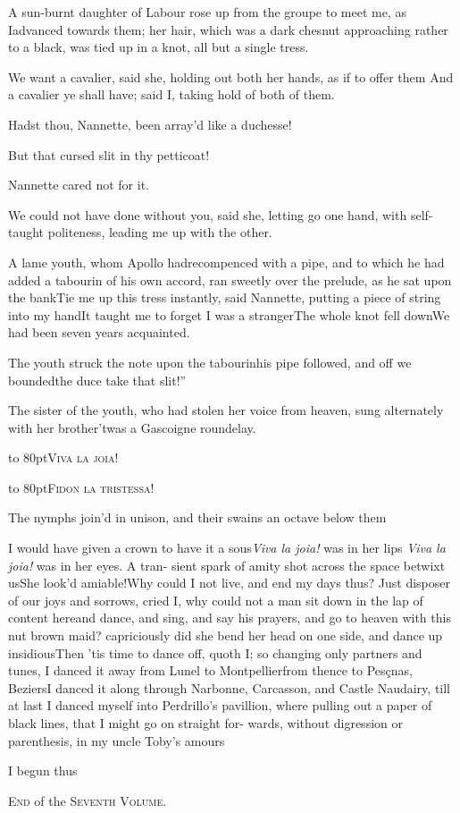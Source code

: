 \documentclass{article}
\begin{document}
A sun-burnt daughter of Labour rose up from the groupe to meet
me, as I\break advanced towards them; her hair, which was a dark chesnut
approaching rather to a black, was tied up in a knot, all but a
single tress.

We want a cavalier, said she, holding out both her hands, as if
to offer them\tsk{}
And a cavalier ye shall have; said I, taking
hold of both of them.

Hadst thou, Nannette, been array’d like a
duchesse!

\tsh But that cursed slit in thy petticoat!

Nannette cared not for it.

We could not have done without you, said she, letting go one
hand, with self-taught politeness, leading me up with the
other.

A lame youth, whom Apollo had\break recompenced with a pipe, and
to which he had added a tabourin of his own accord, ran sweetly
over the prelude, as he sat upon the bank\tsh Tie me up this
tress instantly, said Nannette, putting a piece of string into
my hand\tsk It taught me to forget I was a stranger\tsh The
whole knot fell down\tsh We had been seven years acquainted.

The youth struck the note upon the tabourin\tsk his pipe
followed, and off we bounded\tsh \lqq the duce
take that slit!”

The sister of the youth, who had stolen her voice from heaven,
sung alternately with her brother\tsh ’twas a
Gascoigne roundelay.

\centerline{\hbox to 80pt{\textsc{Viva la joia}!\hss}}
\centerline{\hbox to 80pt{\textsc{Fidon la tristessa}!\hss}}

\vskip-10pt

\noindent
The nymphs join’d in unison, and their swains an octave below them\tsh

I would have given a crown to have it\break
{}\break
a sous\tsk \textit{Viva la joia!} was in her lips\tsk\break
\textit{Viva la joia!} was in her eyes. A tran-
sient spark of amity shot across the space betwixt us\tsh She
look’d amiable!\tsh Why could I not live, and end my days thus?
Just disposer of our joys and sorrows, cried I, why could not a
man sit down in the lap of content here\tsh and dance, and sing,
and say his prayers, and go to heaven with this nut brown maid?
capriciously did she bend her head on one side, and dance up
insidious\tsh\break Then ’tis time to dance off, quoth I; so changing
only partners and tunes, I danced it away from Lunel to
Montpellier\tsh from thence to Pesçnas, Beziers\tsh I danced it
along through Narbonne, Carcasson, and Castle Naudairy, till at
last I danced myself into Perdrillo’s pavillion, where pulling
out a paper of black lines, that I might go on straight for-
wards, without digression or parenthesis, in my uncle Toby’s
amours\tsh

I begun thus\tsh

\vskip 140pt

\centerline{\textsc{End} of the \textsc{Seventh Volume}.}
\end{document}
